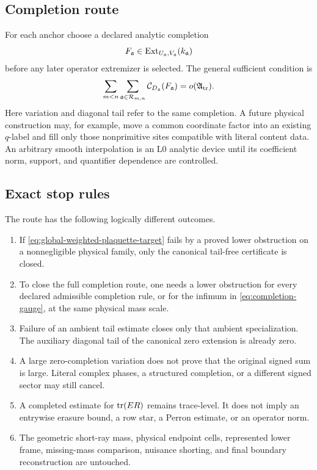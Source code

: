 \subsection{Completion route}

For each anchor choose a declared analytic completion
\[
 F_{\mathfrak a}
 \in
 \operatorname{Ext}_{U_{\mathfrak a},V_{\mathfrak a}}(k_{\mathfrak a})
\]
before any later operator extremizer is selected.  The general sufficient
condition is
\begin{equation}
 \sum_{m<n}\sum_{\mathfrak a\in\mathcal R_{m,n}}
 \mathcal C_{D_{\mathfrak a}}(F_{\mathfrak a})
 =
 o(\mathfrak A_{\rm tr}).
 \label{eq:completion-physical-target}
\end{equation}
Here variation and diagonal tail refer to the same completion.  A future
physical construction may, for example, move a common coordinate factor
into an existing \(q\)-label and fill only those nonprimitive sites
compatible with literal content data.  An arbitrary smooth interpolation
is an L0 analytic device until its coefficient norm, support, and
quantifier dependence are controlled.

\subsection{Exact stop rules}

The route has the following logically different outcomes.
\begin{enumerate}[label=\textup{(G\arabic*)},leftmargin=3.2em]
 \item If \eqref{eq:global-weighted-plaquette-target} fails by a proved
       lower obstruction on a nonnegligible physical family, only the
       canonical tail-free certificate is closed.
 \item To close the full completion route, one needs a lower obstruction
       for every declared admissible completion rule, or for the infimum
       in \eqref{eq:completion-gauge}, at the same physical mass scale.
 \item Failure of an ambient tail estimate closes only that ambient
       specialization.  The auxiliary diagonal tail of the canonical
       zero extension is already zero.
 \item A large zero-completion variation does not prove that the original
       signed sum is large.  Literal complex phases, a structured
       completion, or a different signed sector may still cancel.
 \item A completed estimate for \(\operatorname{tr}(ER)\) remains trace-level.  It does
       not imply an entrywise erasure bound, a row star, a Perron estimate,
       or an operator norm.
 \item The geometric short-ray mass, physical endpoint cells, represented
       lower frame, missing-mass comparison, nuisance shorting, and final
       boundary reconstruction are untouched.
\end{enumerate}


